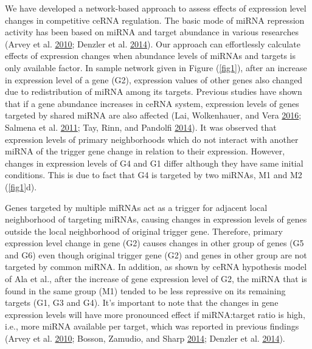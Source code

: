 \documentclass[]{article}
\begin{document}
We have developed a network-based approach to assess effects of
expression level changes in competitive ceRNA regulation. The basic mode
of miRNA repression activity has been based on miRNA and target
abundance in various researches (Arvey et al.
\protect\hyperlink{ref-arvey_target_2010}{2010}; Denzler et al.
\protect\hyperlink{ref-denzler_assessing_2014}{2014}). Our approach can
effortlessly calculate effects of expression changes when abundance
levels of miRNAs and targets is only available factor. In sample network
given in Figure (\autoref{fig1}), after an increase in expression level
of a gene (G2), expression values of other genes also changed due to
redistribution of miRNA among its targets. Previous studies have shown
that if a gene abundance increases in ceRNA system, expression levels of
genes targeted by shared miRNA are also affected (Lai, Wolkenhauer, and
Vera \protect\hyperlink{ref-lai_understanding_2016}{2016}; Salmena et
al. \protect\hyperlink{ref-salmena_cerna_2011}{2011}; Tay, Rinn, and
Pandolfi \protect\hyperlink{ref-tay_multilayered_2014}{2014}). It was
observed that expression levels of primary neighborhoods which do not
interact with another miRNA of the trigger gene change in relation to
their expression. However, changes in expression levels of G4 and G1
differ although they have same initial conditions. This is due to fact
that G4 is targeted by two miRNAs, M1 and M2 (\autoref{fig1}d).

Genes targeted by multiple miRNAs act as a trigger for adjacent local
neighborhood of targeting miRNAs, causing changes in expression levels
of genes outside the local neighborhood of original trigger gene.
Therefore, primary expression level change in gene (G2) causes changes
in other group of genes (G5 and G6) even though original trigger gene
(G2) and genes in other group are not targeted by common miRNA. In
addition, as shown by ceRNA hypothesis model of Ala et al., after the
increase of gene expression level of G2, the miRNA that is found in the
same group (M1) tended to be less repressive on its remaining targets
(G1, G3 and G4). It's important to note that the changes in gene
expression levels will have more pronounced effect if miRNA:target ratio
is high, i.e., more miRNA available per target, which was reported in
previous findings (Arvey et al.
\protect\hyperlink{ref-arvey_target_2010}{2010}; Bosson, Zamudio, and
Sharp \protect\hyperlink{ref-bosson_endogenous_2014}{2014}; Denzler et
al. \protect\hyperlink{ref-denzler_assessing_2014}{2014}).
\end{document}
